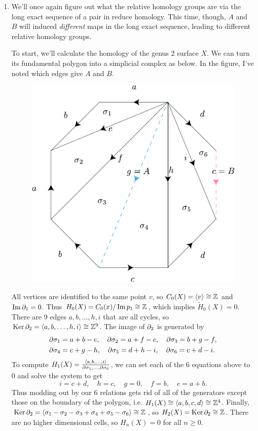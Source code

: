 \documentclass[twoside,10pt]{article}
\begin{document}
\begin{enumerate}
	\item We'll once again figure out what the relative homology groups are via the long exact sequence of a pair in reduce homology. This time, though, $A$ and $B$ will induced \textit{different} maps in the long exact sequence, leading to different relative homology groups.

		To start, we'll calculate the homology of the genus 2 surface $X$. We can turn its fundamental polygon into a simplicial complex as below. In the figure, I've noted which edges give $A$ and $B$.

		\begin{figure}[H]
			\centering
			\includegraphics[scale=1]{fig/17b.pdf}
		\end{figure}

		All vertices are identified to the same point $v$, so $C_0(X) = \langle v \rangle\cong \mathbb{Z}$ and $\operatorname{Im} \partial_1=0$. Thus $H_0(X) = C_0(x) / \operatorname{Im} p_1 \cong \mathbb{Z}$, which implies $\tilde{H}_0(X) = 0$. There are 9 edges $a,b,\dots,h,i$ that are all cycles, so $\operatorname{Ker} \partial_2 = \langle a,b,\dots,h,i \rangle \cong \mathbb{Z}^{9}$. The image of $\partial_2$ is generated by
		\begin{align*}
		\partial \sigma_1 &= a+b-e, \quad \partial \sigma_2 = a+f-e, \quad \partial \sigma_3 = b+g-f, \\
		\partial \sigma_4 &= c+g-h, \quad \partial \sigma_5 = d+h-i, \quad \partial \sigma_6 = c+d-i.
		\end{align*}
		To compute $H_1(X) = \frac{\langle a,b,\dots,i \rangle}{\partial \sigma_1, \dots, \partial \sigma_6} $, we can set each of the 6 equations above to 0 and solve the system to get
		\[
			i = c+d, \quad h = c, \quad g = 0, \quad f=b, \quad e=a+b.
		\]
		Thus modding out by our 6 relations gets rid of all of the generators except those on the boundary of the polygon, i.e. $H_1(X) \cong  \langle a,b,c,d \rangle \cong \mathbb{Z}^{4}$. Finally, $\operatorname{Ker} \partial_2 = \langle \sigma_1-\sigma_2-\sigma_3+\sigma_4+\sigma_5-\sigma_6 \rangle \cong \mathbb{Z}$, so $H_2(X) = \operatorname{Ker} \partial_2 \cong \mathbb{Z}$. There are no higher dimensional cells, so $H_{n}(X)=0$ for all $n \geq 0$.
		


\end{enumerate}
\end{document}
